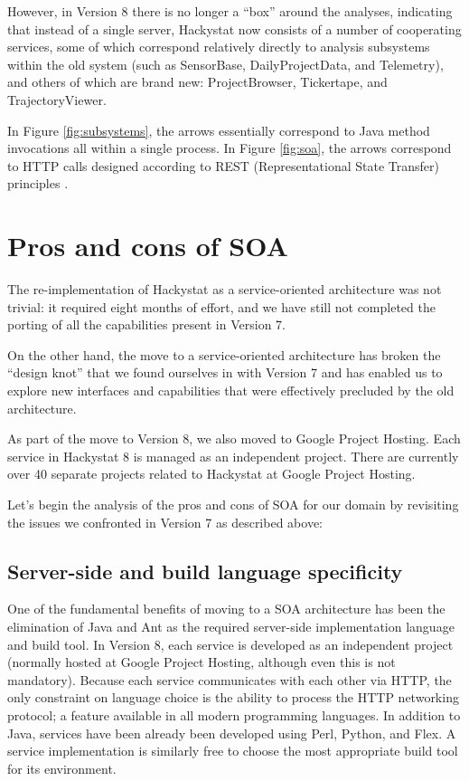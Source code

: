 \documentclass[conference,compsoc,peerreview]{IEEEtran}
\begin{document}
However, in Version 8 there is no longer a ``box'' around the analyses,
indicating that instead of a single server, Hackystat now consists of a
number of cooperating services, some of which correspond relatively
directly to analysis subsystems within the old system (such as SensorBase,
DailyProjectData, and Telemetry), and others of which are brand new:
ProjectBrowser, Tickertape, and TrajectoryViewer.

In Figure \ref{fig:subsystems}, the arrows essentially correspond to Java
method invocations all within a single process.  In Figure \ref{fig:soa},
the arrows correspond to HTTP calls designed according to REST
(Representational State Transfer) principles \cite{Fielding02}.

\section{Pros and cons of SOA}
\label{sec:discussion}

The re-implementation of Hackystat as a service-oriented architecture was
not trivial: it required eight months of effort, and we have still not
completed the porting of all the capabilities present in Version 7.  

On the other hand, the move to a service-oriented architecture has broken
the ``design knot'' that we found ourselves in with Version 7 and has
enabled us to explore new interfaces and capabilities that were effectively
precluded by the old architecture.  

As part of the move to Version 8, we also moved to Google Project Hosting.
Each service in Hackystat 8 is managed as an independent project.  There
are currently over 40 separate projects related to Hackystat at Google
Project Hosting. 

Let's begin the analysis of the pros
and cons of SOA for our domain by revisiting the issues we confronted in
Version 7 as described above:

\subsection{Server-side and build language specificity}

One of the fundamental benefits of moving to a SOA architecture has been
the elimination of Java and Ant as the required server-side implementation
language and build tool.  In Version 8, each service is developed as an
independent project (normally hosted at Google Project Hosting, although
even this is not mandatory).  Because each service communicates with each
other via HTTP, the only constraint on language choice is the ability to
process the HTTP networking protocol; a feature available in all modern
programming languages.  In addition to Java, services have been already
been developed using Perl, Python, and Flex.  A service implementation is
similarly free to choose the most appropriate build tool for its
environment.
\end{document}
